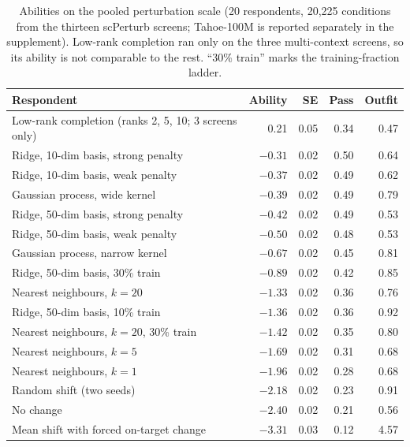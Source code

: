 \documentclass[11pt]{article}
\begin{document}
\begin{table}[t]
\centering
\small
\caption{Abilities on the pooled perturbation scale (20 respondents, 20,225 conditions from
the thirteen scPerturb screens; Tahoe-100M is reported separately in the supplement).
Low-rank completion ran only on the three multi-context screens, so its ability is not
comparable to the rest. ``30\% train'' marks the training-fraction ladder.}
\label{tab:abilB}
\begin{tabular}{@{}lrrrr@{}}
\toprule
Respondent & Ability & SE & Pass & Outfit \\
\midrule
Low-rank completion (ranks 2, 5, 10; 3 screens only) & 0.21 & 0.05 & 0.34 & 0.47 \\
Ridge, 10-dim basis, strong penalty & $-0.31$ & 0.02 & 0.50 & 0.64 \\
Ridge, 10-dim basis, weak penalty & $-0.37$ & 0.02 & 0.49 & 0.62 \\
Gaussian process, wide kernel & $-0.39$ & 0.02 & 0.49 & 0.79 \\
Ridge, 50-dim basis, strong penalty & $-0.42$ & 0.02 & 0.49 & 0.53 \\
Ridge, 50-dim basis, weak penalty & $-0.50$ & 0.02 & 0.48 & 0.53 \\
Gaussian process, narrow kernel & $-0.67$ & 0.02 & 0.45 & 0.81 \\
Ridge, 50-dim basis, 30\% train & $-0.89$ & 0.02 & 0.42 & 0.85 \\
Nearest neighbours, $k=20$ & $-1.33$ & 0.02 & 0.36 & 0.76 \\
Ridge, 50-dim basis, 10\% train & $-1.36$ & 0.02 & 0.36 & 0.92 \\
Nearest neighbours, $k=20$, 30\% train & $-1.42$ & 0.02 & 0.35 & 0.80 \\
Nearest neighbours, $k=5$ & $-1.69$ & 0.02 & 0.31 & 0.68 \\
Nearest neighbours, $k=1$ & $-1.96$ & 0.02 & 0.28 & 0.68 \\
Random shift (two seeds) & $-2.18$ & 0.02 & 0.23 & 0.91 \\
No change & $-2.40$ & 0.02 & 0.21 & 0.56 \\
Mean shift with forced on-target change & $-3.31$ & 0.03 & 0.12 & 4.57 \\
\bottomrule
\end{tabular}
\end{table}
\end{document}

